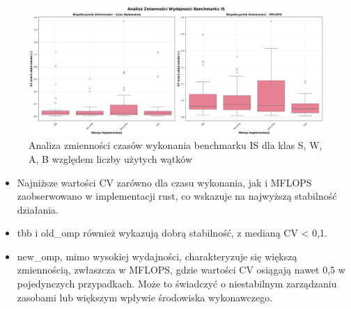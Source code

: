 \begin{figure}[H]
    \centering
    \includegraphics[width=\textwidth]{analiza/images/parallel/is/is_analiza_zmiennosci.png}
    \caption{Analiza zmienności czasów wykonania benchmarku IS dla klas S, W, A, B względem liczby użytych wątków}
    \label{is_analiza_zmiennosci}
\end{figure}
\begin{itemize}
    \item Najniższe wartości CV zarówno dla czasu wykonania, jak i MFLOPS zaobserwowano w implementacji rust, co wskazuje na najwyższą stabilność działania.
    \item tbb i old\_omp również wykazują dobrą stabilność, z medianą CV < 0,1.
    \item new\_omp, mimo wysokiej wydajności, charakteryzuje się większą zmiennością, zwłaszcza w MFLOPS, gdzie wartości CV osiągają nawet 0,5 w pojedynczych przypadkach. Może to świadczyć o niestabilnym zarządzaniu zasobami lub większym wpływie środowiska wykonawczego.
\end{itemize}



